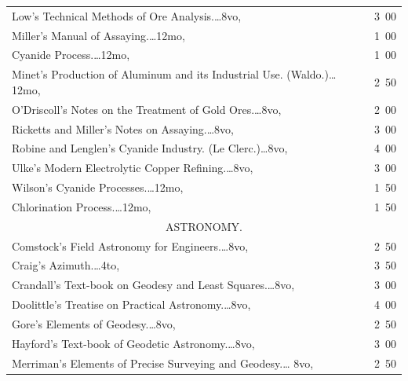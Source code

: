 \documentclass[a4paper,12pt]{book}[2004/02/16]
\theoremstyle{ilemma}
\theoremstyle{itheorem}
\theoremstyle{iother}
\theoremstyle{icorollary}
\theoremstyle{numcorollary}
\theoremstyle{idefinition}
\begin{document}
\begin{longtable}{@{}l@{ }r@{}}
Low's Technical Methods of Ore Analysis.\dotfill\ldots 8vo, &3\ 00\\

Miller's Manual of Assaying.\dotfill\ldots 12mo, &1\ 00\\

\nopagebreak
\indent Cyanide Process.\dotfill\ldots 12mo, &1\ 00\\

Minet's Production of Aluminum and its Industrial
Use. (Waldo.)\dotfill\ldots 12mo, &2\ 50\\

O'Driscoll's Notes on the Treatment of Gold Ores.\dotfill\ldots 8vo,
&2\ 00\\

Ricketts and Miller's Notes on Assaying.\dotfill\ldots 8vo, &3\ 00\\

Robine and Lenglen's Cyanide Industry. (Le Clerc.)\dotfill\ldots 8vo,
&4\ 00\\

Ulke's Modern Electrolytic Copper Refining.\dotfill\ldots 8vo, &3\ 00\\

Wilson's Cyanide Processes.\dotfill\ldots 12mo, &1\ 50\\

\nopagebreak
\indent Chlorination Process.\dotfill\ldots 12mo, &1\ 50\\[3em]

\multicolumn{2}{c}{\large ASTRONOMY.}\\[1em]
\nopagebreak
Comstock's Field Astronomy for Engineers.\dotfill\ldots 8vo, &2\ 50\\

Craig's Azimuth.\dotfill\ldots 4to, &3\ 50\\

Crandall's Text-book on Geodesy and Least Squares.\dotfill\ldots 8vo,
& 3\ 00\\

Doolittle's Treatise on Practical Astronomy.\dotfill\ldots 8vo, &4\ 00\\

Gore's Elements of Geodesy.\dotfill\ldots 8vo, &2\ 50\\

Hayford's Text-book of Geodetic Astronomy.\dotfill\ldots 8vo, &3\ 00\\

Merriman's Elements of Precise Surveying and Geodesy.\dotfill\ldots
8vo, &2\ 50\\


\end{longtable}
\end{document}
